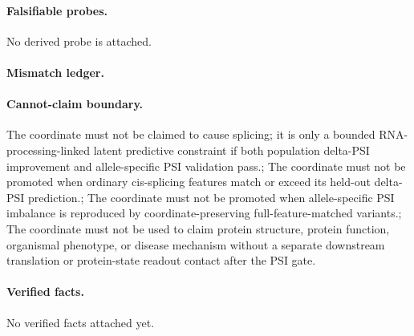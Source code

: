 \paragraph{Falsifiable probes.}
No derived probe is attached.

\paragraph{Mismatch ledger.}
\paragraph{Cannot-claim boundary.} The coordinate must not be claimed to cause splicing; it is only a bounded RNA-processing-linked latent predictive constraint if both population delta-PSI improvement and allele-specific PSI validation pass.; The coordinate must not be promoted when ordinary cis-splicing features match or exceed its held-out delta-PSI prediction.; The coordinate must not be promoted when allele-specific PSI imbalance is reproduced by coordinate-preserving full-feature-matched variants.; The coordinate must not be used to claim protein structure, protein function, organismal phenotype, or disease mechanism without a separate downstream translation or protein-state readout contact after the PSI gate.

\paragraph{Verified facts.}
No verified facts attached yet.
